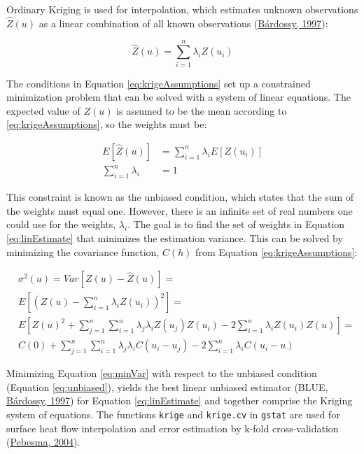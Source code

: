 Ordinary Kriging is used for interpolation, which estimates unknown observations \(\hat{Z}(u)\) as a linear combination of all known observations (\protect\hyperlink{ref-bardossy1997}{Bárdossy, 1997}):

\begin{equation}
  \hat{Z}(u) = \sum_{i=1}^n \lambda_i Z(u_i)
  \label{eq:linEstimate}
\end{equation}

The conditions in Equation \eqref{eq:krigeAssumptions} set up a constrained minimization problem that can be solved with a system of linear equations. The expected value of \(Z(u)\) is assumed to be the mean according to \eqref{eq:krigeAssumptions}, so the weights must be:

\begin{equation}
  \begin{aligned}
    E[\hat{Z}(u)] &= \sum_{i=1}^n \lambda_i E[Z(u_i)] \\
    \sum_{i=1}^n \lambda_i &= 1
  \end{aligned}
  \label{eq:unbiased}
\end{equation}

This constraint is known as the unbiased condition, which states that the sum of the weights must equal one. However, there is an infinite set of real numbers one could use for the weights, \(\lambda_i\). The goal is to find the set of weights in Equation \eqref{eq:linEstimate} that minimizes the estimation variance. This can be solved by minimizing the covariance function, \(C(h)\) from Equation \eqref{eq:krigeAssumptions}:

\begin{equation}
  \begin{aligned}
    & \sigma^2(u) = Var[Z(u) - \hat{Z}(u)] = \\
    & E\left[(Z(u) - \sum_{i=1}^n \lambda_i Z(u_i))^2\right] = \\
    & E\left[Z(u)^2 + \sum_{j=1}^n \sum_{i=1}^n \lambda_j \lambda_i Z(u_j)Z(u_i) - 2 \sum_{i=1}^n \lambda_i Z(u_i)Z(u)\right] = \\
    & C(0) + \sum_{j=1}^n \sum_{i=1}^n \lambda_j \lambda_i C(u_i - u_j) - 2 \sum_{i=1}^n \lambda_i C(u_i - u)
  \end{aligned}
  \label{eq:minVar}
\end{equation}

Minimizing Equation \eqref{eq:minVar} with respect to the unbiased condition (Equation \eqref{eq:unbiased}), yields the best linear unbiased estimator (BLUE, \protect\hyperlink{ref-bardossy1997}{Bárdossy, 1997}) for Equation \eqref{eq:linEstimate} and together comprise the Kriging system of equations. The functions \texttt{krige} and \texttt{krige.cv} in \texttt{gstat} are used for surface heat flow interpolation and error estimation by k-fold cross-validation (\protect\hyperlink{ref-pebesma2004}{Pebesma, 2004}).

